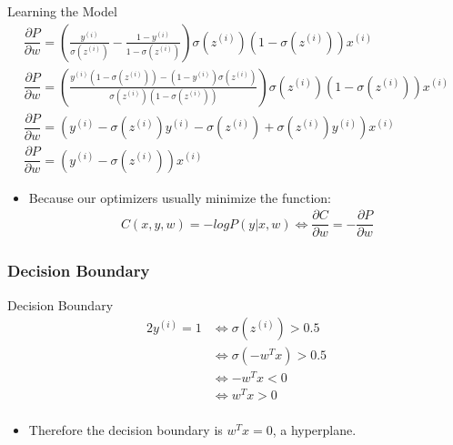 \begin{frame}{Learning the Model}
	\begin{gather*}
	\dfrac{\partial P}{\partial w} = \left(\frac{y^{(i)}}{\sigma(z^{(i)})} - \frac{1-y^{(i)}}{1-\sigma(z^{(i)})}\right) \sigma(z^{(i)})(1-\sigma(z^{(i)}))x^{(i)}\\
	\dfrac{\partial P}{\partial w} = \left( \frac{y^{(i)}(1-\sigma(z^{(i)})) - (1-y^{(i)})\sigma(z^{(i)})}{\sigma(z^{(i)})(1-\sigma(z^{(i)}))} \right) \sigma(z^{(i)})(1-\sigma(z^{(i)}))x^{(i)}\\
	\dfrac{\partial P}{\partial w} = \left(y^{(i)} - \sigma(z^{(i)})y^{(i)} - \sigma(z^{(i)}) + \sigma(z^{(i)})y^{(i)}\right) x^{(i)} \\
	\dfrac{\partial P}{\partial w} = \left(y^{(i)} - \sigma(z^{(i)})\right)x^{(i)}
	\end{gather*}
	\begin{itemize}
		\item Because our optimizers usually minimize the function:
		\begin{gather*}
		C(x,y,w) = -logP(y|x,w) \Leftrightarrow \dfrac{\partial C}{\partial w} = -\dfrac{\partial P}{\partial w}
		\end{gather*}
	\end{itemize}
\end{frame}

\subsubsection{Decision Boundary}
\begin{frame}{Decision Boundary}
	\begin{alignat*}{2}
	y^{(i)} = 1 &\Leftrightarrow \sigma(z^{(i)}) > 0.5\\
	 &\Leftrightarrow \sigma(-w^Tx) > 0.5\\
	 &\Leftrightarrow -w^Tx < 0\\
	 &\Leftrightarrow w^Tx > 0\\
	\end{alignat*}
	\begin{itemize}
		\item Therefore the decision boundary is $w^Tx = 0$, a hyperplane.
	\end{itemize}
\end{frame}

